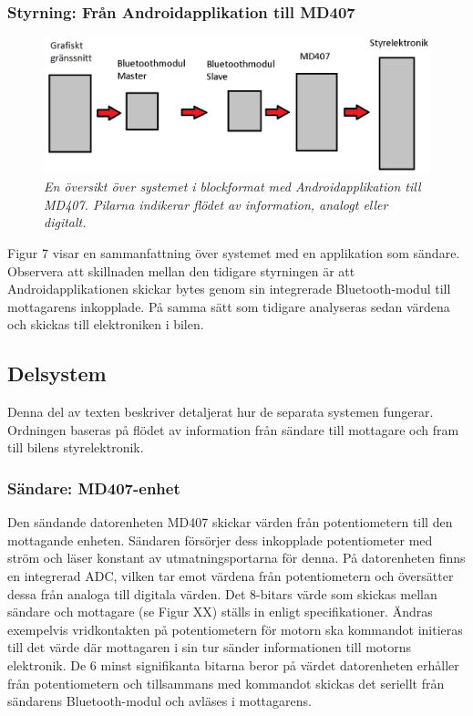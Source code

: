 \documentclass[a4paper]{article}
\begin{document}
\subsubsection{Styrning: Från Androidapplikation till MD407}
\begin{figure}[H]
\includegraphics[width=\textwidth]{systemoversiktAndroid.jpg}
\centering
\caption{\it En översikt över systemet i blockformat med Androidapplikation till MD407. Pilarna indikerar flödet av information, analogt eller digitalt.}
\end{figure} 

Figur 7 visar en sammanfattning över systemet med en applikation som sändare. Observera att skillnaden mellan den tidigare styrningen är att Androidapplikationen skickar bytes genom sin integrerade Bluetooth-modul till mottagarens inkopplade. På samma sätt som tidigare analyseras sedan värdena och skickas till elektroniken i bilen.


\subsection{Delsystem}
Denna del av texten beskriver detaljerat hur de separata systemen fungerar. Ordningen baseras på flödet av information från sändare till mottagare och fram till bilens styrelektronik.




\subsubsection{Sändare: MD407-enhet}
Den sändande datorenheten MD407 skickar värden från potentiometern till den mottagande enheten. Sändaren försörjer dess inkopplade potentiometer med ström och läser konstant av utmatningsportarna för denna. På datorenheten finns en integrerad ADC, vilken tar emot värdena från potentiometern och översätter dessa från analoga till digitala värden. Det 8-bitars värde som skickas mellan sändare och mottagare (se Figur XX) ställs in enligt specifikationer. Ändras exempelvis vridkontakten på potentiometern för motorn ska kommandot initieras till det värde där mottagaren i sin tur sänder informationen till motorns elektronik. De 6 minst signifikanta bitarna beror på värdet datorenheten erhåller från potentiometern och tillsammans med kommandot skickas det seriellt från sändarens Bluetooth-modul och avläses i mottagarens.
\end{document}
